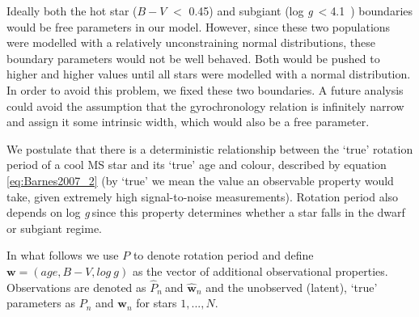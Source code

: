 \documentclass[11pt,preprint]{aastex}
\newcommand{\logg}{log \emph{g}}
\newcommand{\ph}{$\hat{P}_n$}
\newcommand{\ncooldwarfs}{45~}
\newcommand{\subcut}{4.1~}
\begin{document}
Ideally both the hot star ($B-V$ $<$ 0.45) and subgiant (\logg$~<$\subcut)
boundaries would be free parameters in our model.
However, since these two populations were modelled with a relatively
unconstraining normal distributions, these boundary parameters would not be
well behaved.
Both would be pushed to higher and higher values until all stars were modelled
with a normal distribution.
In order to avoid this problem, we fixed these two boundaries.
A future analysis could avoid the assumption that the gyrochronology relation
is infinitely narrow and assign it some intrinsic width, which would also be
a free parameter.

We postulate that there is a deterministic relationship between the `true'
rotation period of a cool MS star and its `true' age and colour, described by
equation \ref{eq:Barnes2007_2} (by `true' we mean the value an observable
property would take, given extremely high signal-to-noise measurements).
Rotation period also depends on \logg$~$since this property determines whether
a star falls in the dwarf or subgiant regime.

In what follows we use $P$ to denote rotation period and define
$\mathbf{w} = (age, B-V, log~g)$ as the vector of additional observational
properties.
Observations are denoted as \ph$~$and $\hat{\mathbf{w}}_n$ and the unobserved
(latent), `true' parameters as $P_n$ and $\mathbf{w}_n$ for stars $1,...,N$.
\end{document}
